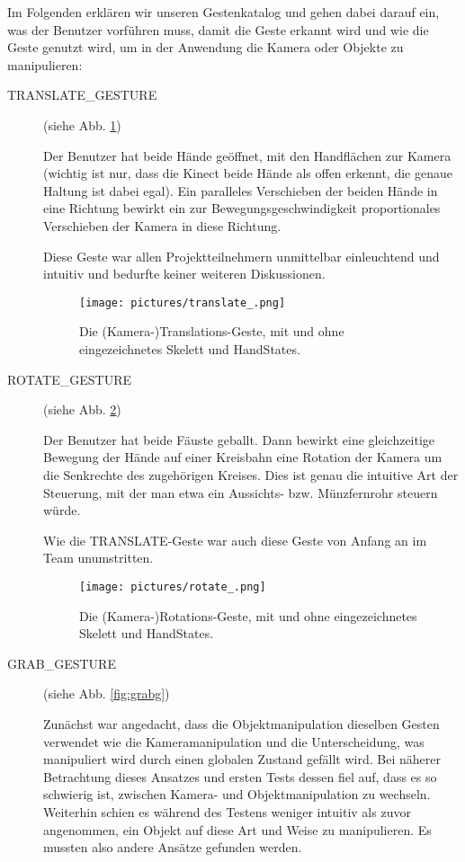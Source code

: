 	Im Folgenden erklären wir unseren Gestenkatalog und gehen dabei darauf ein, was der Benutzer vorführen muss, damit die Geste erkannt wird und wie die Geste genutzt wird, um in der Anwendung die Kamera oder Objekte zu manipulieren:\par\bigskip
	\begin{description}
		\item[TRANSLATE\_GESTURE] (siehe Abb. \ref{fig:translateg})\par
		Der Benutzer hat beide Hände geöffnet, mit den Handflächen zur Kamera (wichtig ist nur, dass die Kinect beide Hände als offen erkennt, die genaue Haltung ist dabei egal). Ein paralleles Verschieben der beiden Hände in eine Richtung bewirkt ein zur Bewegungsgeschwindigkeit proportionales Verschieben der Kamera in diese Richtung.\par 
		Diese Geste war allen Projektteilnehmern unmittelbar einleuchtend und intuitiv und bedurfte keiner weiteren Diskussionen. 
		\begin{figure}[h!]
		\centering
		\texttt{[image: pictures/translate\_.png]}
		\caption{Die (Kamera-)Translations-Geste, mit und ohne eingezeichnetes Skelett und HandStates.}\label{fig:translateg}
		\end{figure}
		\par
		\item[ROTATE\_GESTURE] (siehe Abb. \ref{fig:rotateg})\par
		Der Benutzer hat beide Fäuste geballt. Dann bewirkt eine gleichzeitige Bewegung der Hände auf einer Kreisbahn eine Rotation der Kamera um die Senkrechte des zugehörigen Kreises. Dies ist genau die intuitive Art der Steuerung, mit der man etwa ein Aussichts- bzw. Münzfernrohr steuern würde.\par
		Wie die TRANSLATE-Geste war auch diese Geste von Anfang an im Team unumstritten.
		\begin{figure}[h!]
		\centering
		\texttt{[image: pictures/rotate\_.png]}
		\caption{Die (Kamera-)Rotations-Geste, mit und ohne eingezeichnetes Skelett und HandStates.}\label{fig:rotateg}
		\end{figure}		
		\par
		\item[GRAB\_GESTURE] (siehe Abb. \ref{fig:grabg})\par
		Zunächst war angedacht, dass die Objektmanipulation dieselben Gesten verwendet wie die Kameramanipulation und die Unterscheidung, was manipuliert wird durch einen globalen Zustand gefällt wird. Bei näherer Betrachtung dieses Ansatzes und ersten Tests dessen fiel auf, dass es so schwierig ist, zwischen Kamera- und Objektmanipulation zu wechseln. Weiterhin schien es während des Testens weniger intuitiv als zuvor angenommen, ein Objekt auf diese Art und Weise zu manipulieren. Es mussten also andere Ansätze gefunden werden.\par 

\end{description}
